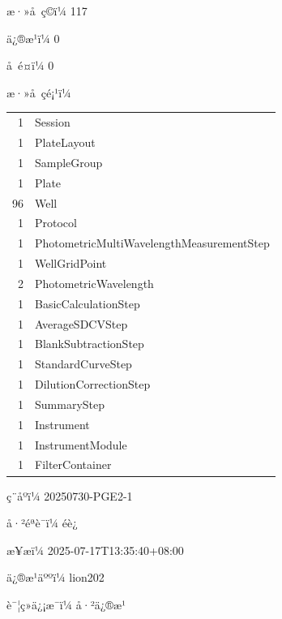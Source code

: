 \documentclass[UTF8,10pt,a4paper,fontset=fandol]{ctexart}
\newcommand{\fieldvalue}[1]{#1}
\begin{document}
\noindent
æ·»å ç©ï¼%
\fieldvalue{117}

\noindent
ä¿®æ¹ï¼%
\fieldvalue{0}

\noindent
å é¤ï¼%
\fieldvalue{0}

\vspace{0.5em}

\noindent
æ·»å çé¡¹ï¼

\begin{tabular}{r l}
1 & Session\\
1 & PlateLayout\\
1 & SampleGroup\\
1 & Plate\\
96 & Well\\
1 & Protocol\\
1 & PhotometricMultiWavelengthMeasurementStep\\
1 & WellGridPoint\\
2 & PhotometricWavelength\\
1 & BasicCalculationStep\\
1 & AverageSDCVStep\\
1 & BlankSubtractionStep\\
1 & StandardCurveStep\\
1 & DilutionCorrectionStep\\
1 & SummaryStep\\
1 & Instrument\\
1 & InstrumentModule\\
1 & FilterContainer
\end{tabular}

\vspace{0.8em}

\noindent
ç¨åºï¼%
\fieldvalue{20250730-PGE2-1}

\noindent
å·²éªè¯ï¼%
\fieldvalue{éè¿}

\noindent
æ¥æï¼%
\fieldvalue{2025-07-17T13:35:40+08:00}

\noindent
ä¿®æ¹äººï¼%
\fieldvalue{lion202}

\noindent
è¯¦ç»ä¿¡æ¯ï¼%
\fieldvalue{å·²ä¿®æ¹}
\end{document}
